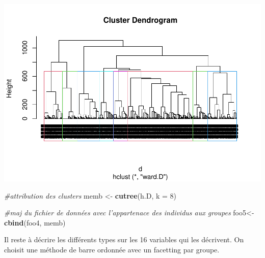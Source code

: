 \documentclass[
]{book}
\newenvironment{Shaded}{\begin{snugshade}}{\end{snugshade}}
\newcommand{\CommentTok}[1]{\textcolor[rgb]{0.56,0.35,0.01}{\textit{#1}}}
\newcommand{\DataTypeTok}[1]{\textcolor[rgb]{0.13,0.29,0.53}{#1}}
\newcommand{\DecValTok}[1]{\textcolor[rgb]{0.00,0.00,0.81}{#1}}
\newcommand{\KeywordTok}[1]{\textcolor[rgb]{0.13,0.29,0.53}{\textbf{#1}}}
\newcommand{\NormalTok}[1]{#1}
\newcommand{\StringTok}[1]{\textcolor[rgb]{0.31,0.60,0.02}{#1}}
\begin{document}
\includegraphics{bookdown-demo_files/figure-latex/0814-1.pdf}

\begin{Shaded}
\begin{Highlighting}[]
\CommentTok{#attribution des clusters}
\NormalTok{memb <-}\StringTok{ }\KeywordTok{cutree}\NormalTok{(h.D, }\DataTypeTok{k =} \DecValTok{8}\NormalTok{)}

\CommentTok{#maj du fichier de données avec l'appartenace des individus aux groupes}
\NormalTok{foo5<-}\KeywordTok{cbind}\NormalTok{(foo4, memb)}
\end{Highlighting}
\end{Shaded}

Il reste à décrire les différents types sur les 16 variables qui les décrivent. On choisit une méthode de barre ordonnée avec un facetting par groupe.
\end{document}
